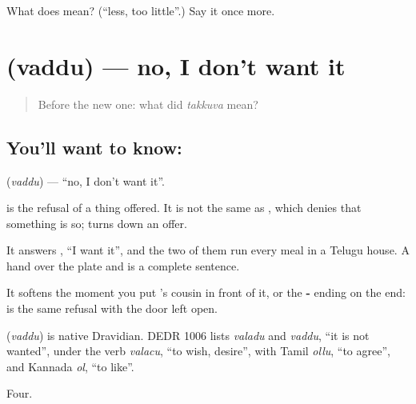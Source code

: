 \begin{tcolorbox}[breakable,colback=teal!4,colframe=teal!35!black,title={Before you move on}]
What does  mean? (\textquotedblleft{}less, too little\textquotedblright{}.) Say it once more.
\end{tcolorbox}
\section[\texorpdfstring{\te{వద్దు} (vaddu)}{వద్దు (vaddu)}]{ (vaddu) — no, I don't want it}

\label{lesson:TE-C58-no-thanks}



\begin{quote}
Before the new one: what did \emph{takkuva} mean?
\end{quote}

\subsection*{You'll want to know: }
\textbf{} (\emph{vaddu}) — \textquotedblleft{}no, I don't want it\textquotedblright{}.

 is the refusal of a thing offered. It is not the same as , which denies that something is so;  turns down an offer.

It answers , \textquotedblleft{}I want it\textquotedblright{}, and the two of them run every meal in a Telugu house. A hand over the plate and  is a complete sentence.

It softens the moment you put 's cousin in front of it, or the \textbf{-} ending on the end:  is the same refusal with the door left open.

\begin{cousinweb}
\textbf{} (\emph{vaddu}) is native Dravidian. DEDR 1006 lists \emph{valadu} and \emph{vaddu}, \textquotedblleft{}it is not wanted\textquotedblright{}, under the verb \emph{valacu}, \textquotedblleft{}to wish, desire\textquotedblright{}, with Tamil \emph{ollu}, \textquotedblleft{}to agree\textquotedblright{}, and Kannada \emph{ol}, \textquotedblleft{}to like\textquotedblright{}.
\end{cousinweb}

\begin{grammarlens}[title={What you've built}]
Four.
\end{grammarlens}

